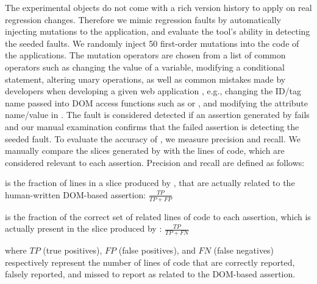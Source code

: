 The experimental objects do not come with a rich version history to apply \tool on real regression changes. Therefore we mimic regression faults by automatically injecting mutations to the application, and evaluate the tool's ability in detecting the seeded faults. We randomly inject 50 first-order mutations into the \javascript code of the applications. The mutation operators are chosen from a list of common operators such as changing the value of a variable, modifying a conditional statement, altering unary operations, as well as common mistakes made by developers when developing a given web application \cite{mirshokraie:tse15}, e.g., changing the ID/tag name passed into DOM access functions such as  or , and modifying the attribute name/value in . The fault is considered detected if an assertion generated by \tool fails and our manual examination confirms that the failed assertion is detecting the seeded fault.
 To evaluate the accuracy of \tool, we measure precision and recall. We manually compare the slices generated by \tool with the \javascript lines of code, which are considered relevant to each assertion. Precision and recall are defined as follows:
\begin{description}[noitemsep, nolistsep, font=\normalfont\itshape]
\item [Precision] is the fraction of lines in a slice produced by \tool, that are actually related to the human-written DOM-based assertion: $\frac{TP}{TP+FP}$ 
\item [Recall] is the fraction of the correct set of related lines of code to each assertion, which is actually present in the slice produced by \tool: $\frac{TP}{TP+FN}$ 
\end{description}
where $TP$ (true positives), $FP$ (false positives), and $FN$ (false negatives) respectively represent the number of lines of code that are correctly reported, falsely reported, and missed to report as related to the DOM-based assertion.

